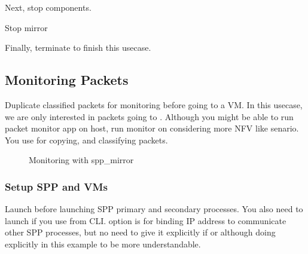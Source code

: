 \documentclass[a4paper,11pt,openany,oneside,english]{sphinxmanual}
\begin{document}
Next, stop components.

\begin{sphinxVerbatim}[commandchars=\\\{\},formatcom=\footnotesize]
 Stop mirror

\end{sphinxVerbatim}

Finally, terminate  to finish this usecase.

\begin{sphinxVerbatim}[commandchars=\\\{\},formatcom=\footnotesize]
\end{sphinxVerbatim}


\subsection{Monitoring Packets}
\label{\detokenize{usecases/spp_mirror:monitoring-packets}}\label{\detokenize{usecases/spp_mirror:spp-usecases-mirror-monitor}}
Duplicate classified packets for monitoring before going to a VM.
In this usecase, we are only interested in packets going to .
Although you might be able to run packet monitor app on host,
run monitor on  considering more NFV like senario.
You use  for copying, and  classifying packets.

\begin{figure}[htbp]
\centering
\capstart

\noindent{}
\caption{Monitoring with spp\_mirror}\label{\detokenize{usecases/spp_mirror:id5}}\label{\detokenize{usecases/spp_mirror:figure-usecase-monitor-overview}}\end{figure}


\subsubsection{Setup SPP and VMs}
\label{\detokenize{usecases/spp_mirror:setup-spp-and-vms}}
Launch  before launching SPP primary and secondary processes.
You also need to launch   if you use  from CLI.
 option is for binding IP address to communicate other SPP processes,
but no need to give it explicitly if  or  although
doing explicitly in this example to be more understandable.
\end{document}
